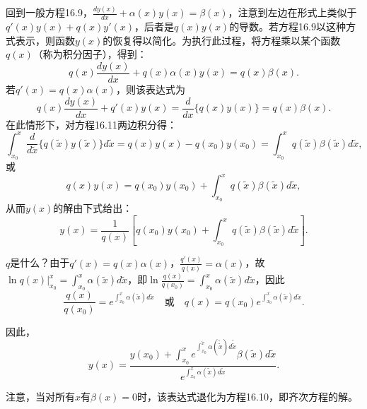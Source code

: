 \begin{translation}
回到一般方程16.9，$\frac{d y(x)}{dx} + \alpha(x)y(x) = \beta(x)$，注意到左边在形式上类似于$q'(x)y(x) + q(x)y'(x)$，后者是$q(x)y(x)$的导数。若方程16.9以这种方式表示，则函数$y(x)$的恢复得以简化。为执行此过程，将方程乘以某个函数$q(x)$（称为积分因子），得到：
\[
q(x)\frac{d y(x)}{dx} + q(x)\alpha(x)y(x) = q(x)\beta(x).
\]
若$q'(x) = q(x)\alpha(x)$，则该表达式为
\[
q(x)\frac{d y(x)}{dx} + q'(x)y(x) = \frac{d}{dx}\{q(x)y(x)\} = q(x)\beta(x). \tag{16.11}
\]
在此情形下，对方程16.11两边积分得：
\[
\int_{x_0}^{x} \frac{d}{d\tilde{x}}\{q(\tilde{x})y(\tilde{x})\} d\tilde{x} = q(x) y(x) - q(x_0) y(x_0) = \int_{x_0}^{x} q(\tilde{x})\beta(\tilde{x}) d\tilde{x}, \tag{16.12}
\]
或
\[
q(x)y(x) = q(x_0)y(x_0) + \int_{x_0}^{x} q(\tilde{x})\beta(\tilde{x}) d\tilde{x}, \tag{16.13}
\]
从而$y(x)$的解由下式给出：
\[
y(x) = \frac{1}{q(x)}\left[q(x_0)y(x_0) + \int_{x_0}^{x} q(\tilde{x})\beta(\tilde{x}) d\tilde{x}\right]. \tag{16.14}
\]

$q$是什么？由于$q'(x) = q(x)\alpha(x)$，$\frac{q'(x)}{q(x)} = \alpha(x)$，故$\ln q(x)\big|_{x_0}^{x} = \int_{x_0}^{x} \alpha(\tilde{x}) d\tilde{x}$，即$\ln\frac{q(x)}{q(x_0)} = \int_{x_0}^{x} \alpha(\tilde{x}) d\tilde{x}$，因此
\[
\frac{q(x)}{q(x_0)} = e^{\int_{x_0}^{x} \alpha(\tilde{x}) d\tilde{x}} \quad \text{或} \quad q(x) = q(x_0)e^{\int_{x_0}^{x} \alpha(\tilde{x}) d\tilde{x}}.
\]

因此，
\[
y(x) = \frac{y(x_0) + \int_{x_0}^{x} e^{\int_{x_0}^{\tilde{x}} \alpha(\tilde{\tilde{x}}) d\tilde{\tilde{x}}} \beta(\tilde{x}) d\tilde{x}}{e^{\int_{x_0}^{x} \alpha(\tilde{x}) d\tilde{x}}}. \tag{16.15}
\]

注意，当对所有$x$有$\beta(x) = 0$时，该表达式退化为方程16.10，即齐次方程的解。
\end{translation}
